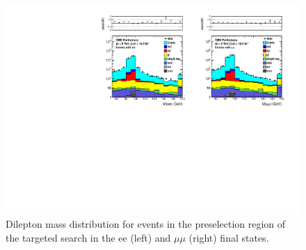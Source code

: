 \begin{figure}[hbt]
  \begin{center}
	\includegraphics[width=1.0\linewidth]{plots/dilmass_targeted_19p5fb.pdf}
	\caption{
	  \label{fig:dilmass_2j_targeted}\protect 
	  Dilepton mass distribution for events in the preselection region of the targeted search
	  in the ee (left) and $\mu\mu$ (right) final states.}



  \end{center}
\end{figure}

